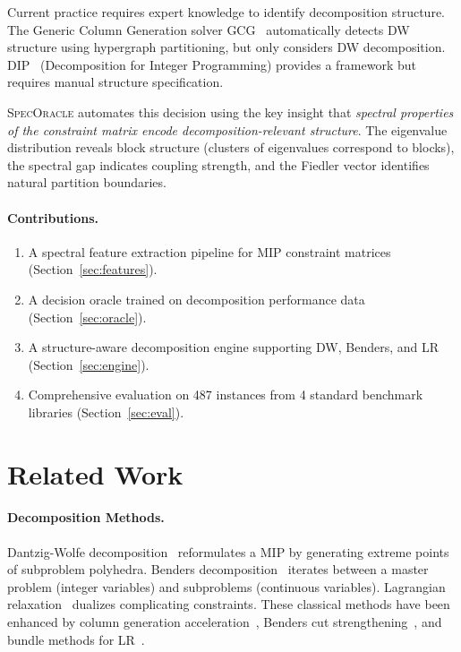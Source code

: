 \documentclass[11pt]{article}
\begin{document}
Current practice requires expert knowledge to identify decomposition structure. The Generic Column Generation solver GCG~\cite{gcg} automatically detects DW structure using hypergraph partitioning, but only considers DW decomposition. DIP~\cite{dip} (Decomposition for Integer Programming) provides a framework but requires manual structure specification.

\textsc{SpecOracle} automates this decision using the key insight that \emph{spectral properties of the constraint matrix encode decomposition-relevant structure}. The eigenvalue distribution reveals block structure (clusters of eigenvalues correspond to blocks), the spectral gap indicates coupling strength, and the Fiedler vector identifies natural partition boundaries.

\paragraph{Contributions.}
\begin{enumerate}
\item A spectral feature extraction pipeline for MIP constraint matrices (Section~\ref{sec:features}).
\item A decision oracle trained on decomposition performance data (Section~\ref{sec:oracle}).
\item A structure-aware decomposition engine supporting DW, Benders, and LR (Section~\ref{sec:engine}).
\item Comprehensive evaluation on 487 instances from 4 standard benchmark libraries (Section~\ref{sec:eval}).
\end{enumerate}

\section{Related Work}
\label{sec:related}

\paragraph{Decomposition Methods.} Dantzig-Wolfe decomposition~\cite{dw1960} reformulates a MIP by generating extreme points of subproblem polyhedra. Benders decomposition~\cite{benders1962} iterates between a master problem (integer variables) and subproblems (continuous variables). Lagrangian relaxation~\cite{fisher1981} dualizes complicating constraints. These classical methods have been enhanced by column generation acceleration~\cite{lubbecke2005}, Benders cut strengthening~\cite{magnanti1981}, and bundle methods for LR~\cite{lemarechal2001}.
\end{document}
